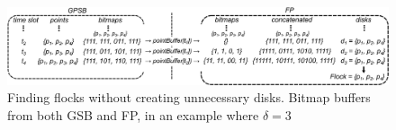 \begin{figure}
    \centering
    \includegraphics[width=\linewidth]{images/flow.png}
    \caption{Finding flocks without creating unnecessary disks. Bitmap buffers from both GSB and FP, in an example where
        $\delta = 3$}
    \label{fig:flow}
\end{figure}
